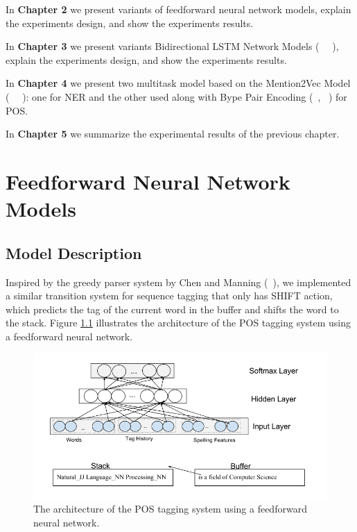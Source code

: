 \documentclass{sfuthesis}
\begin{document}
In \textbf{Chapter 2}  we present variants of feedforward neural network models, explain the experiments design, and show the experiments results.

In \textbf{Chapter 3} we present variants Bidirectional LSTM Network Models (~\citeauthor{Hochreiter97longshort-term} ~\citeyear{Hochreiter97longshort-term}), explain the experiments design, and show the experiments results.

In \textbf{Chapter 4} we present two multitask model based on the Mention2Vec Model  (~\citeauthor{stratos2016mention2vec} ~\citeyear{stratos2016mention2vec}): one for NER and the other used along with Bype Pair Encoding (~\citeauthor{gage1994new}, ~\citeyear{gage1994new}) for POS.

In \textbf{Chapter 5} we summarize the experimental results of the previous chapter.

\chapter{Feedforward Neural Network Models}

\section{Model Description}
\label{Feedforward-CRF}
Inspired by the greedy parser system by Chen and Manning (~\citeyear{chen2014fast}), we implemented a similar transition system for sequence tagging that only has SHIFT action, which predicts the tag of the current word in the buffer and shifts the word to the stack. Figure \ref{fig:greedypos} illustrates the architecture of the POS tagging system using a feedforward neural network.

\begin{figure}
  \centering
  \includegraphics[scale=0.6]{greedypos.png}
 \caption{The architecture of the POS tagging system using a feedforward neural network.}
  \label{fig:greedypos}
\end{figure}
\end{document}

